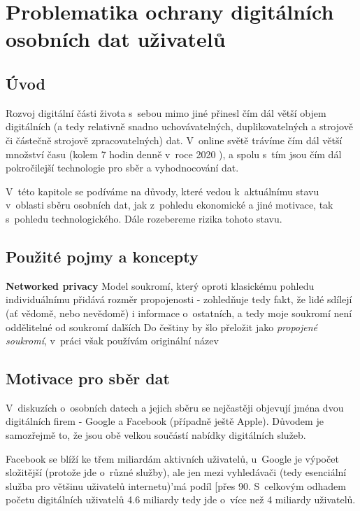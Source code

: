 \chapter{Problematika ochrany digitálních osobních dat uživatelů}

\section{Úvod}
Rozvoj digitální části života s~sebou mimo jiné přinesl čím dál větší objem digitálních (a tedy relativně snadno uchovávatelných, duplikovatelných a strojově či částečně strojově zpracovatelných) dat. V~online světě trávíme čím dál větší množství času (kolem 7 hodin denně v~roce 2020 \citep{digital-2021-report}), a spolu s~tím jsou čím dál pokročilejší technologie pro sběr a vyhodnocování dat.

V~této kapitole se podíváme na důvody, které vedou k~aktuálnímu stavu v~oblasti sběru osobních dat, jak z~pohledu ekonomické a jiné motivace, tak s~pohledu technologického. Dále rozebereme rizika tohoto stavu.

\section{Použité pojmy a koncepty}

\textbf{Networked privacy}
Model soukromí, který oproti klasickému pohledu individuálnímu přidává rozměr propojenosti - zohledňuje tedy fakt, že lidé sdílejí (ať vědomě, nebo nevědomě) i informace o~ostatních, a tedy moje soukromí není oddělitelné od soukromí dalších\citep{networked-privacy}
Do češtiny by šlo přeložit jako \textit{propojené soukromí}, v~práci však používám originální název

\section{Motivace pro sběr dat}

V~diskuzích o~osobních datech a jejich sběru se nejčastěji objevují jména dvou digitálních firem - Google a Facebook (případně ještě Apple). Důvodem je samozřejmě to, že jsou obě velkou součástí nabídky digitálních služeb.

Facebook se blíží ke třem miliardám aktivních uživatelů\citep{facebook-active-users}, u~Google je výpočet složitější (protože jde o~různé služby), ale jen mezi vyhledávači (tedy esenciální služba pro většinu uživatelů internetu)'má podíl [přes 90\citep{google-search}. S~celkovým odhadem početu digitálních uživatelů 4.6 miliardy\citep{digital-2021-report} tedy jde o~více než 4 miliardy uživatelů.

